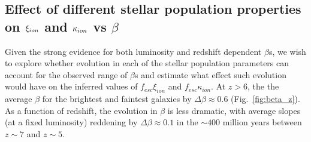 \subsection{Effect of different stellar population properties on $\xi_{\lowercase{ion}}$ and $\kappa_{\lowercase{ion}}$ vs $\beta$}\label{sec:beta_effect_stellar_pop}
Given the strong evidence for both luminosity and redshift dependent $\beta$s, we wish to explore whether evolution in each of the stellar population parameters can account for the observed range of $\beta$s and estimate what effect such evolution would have on the inferred values of $f_{esc}\xi_{ion}$ and $f_{esc}\kappa_{ion}$. At $z >6$, the the average $\beta$ for the brightest and faintest galaxies by $\Delta\beta \approx 0.6$ (Fig.~\ref{fig:beta_z}). As a function of redshift, the evolution in $\beta$ is less dramatic, with average slopes (at a fixed luminosity) reddening by $\Delta\beta \approx 0.1$ in the $\sim400$ million years between $z\sim7$ and $z\sim5$.

